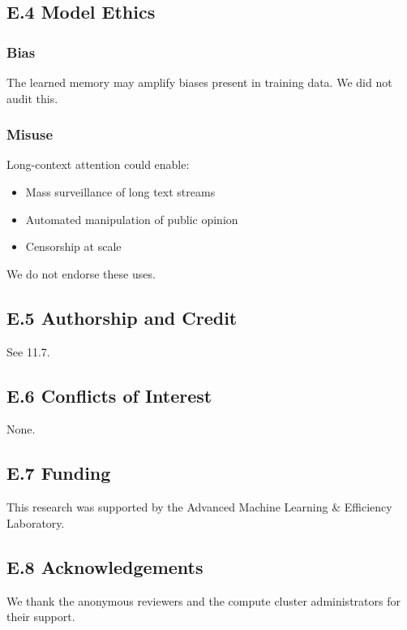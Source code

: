 \subsection{E.4 Model Ethics}

\subsubsection{Bias}

The learned memory may amplify biases present in training data. We did 
not audit this.

\subsubsection{Misuse}

Long-context attention could enable:

\begin{itemize}
\item Mass surveillance of long text streams
\item Automated manipulation of public opinion
\item Censorship at scale

\end{itemize}
We do not endorse these uses.

\subsection{E.5 Authorship and Credit}

See  11.7.

\subsection{E.6 Conflicts of Interest}

None.

\subsection{E.7 Funding}

This research was supported by the Advanced Machine Learning \& Efficiency Laboratory.

\subsection{E.8 Acknowledgements}

We thank the anonymous reviewers and the compute cluster administrators for their support.

